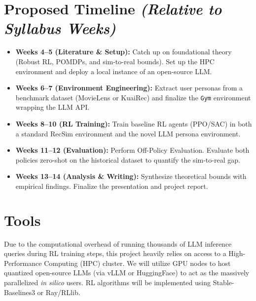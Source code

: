 \documentclass[]{../0_aga-homework}
\begin{document}
\section*{Proposed Timeline \textit{(Relative to Syllabus Weeks)}}
\begin{itemize}
    \item \textbf{Weeks 4--5 (Literature \& Setup):} Catch up on foundational theory (Robust RL, POMDPs, and sim-to-real bounds). Set up the HPC environment and deploy a local instance of an open-source LLM.
    \item \textbf{Weeks 6--7 (Environment Engineering):} Extract user personas from a benchmark dataset (MovieLens or KuaiRec) and finalize the \texttt{Gym} environment wrapping the LLM API.
    \item \textbf{Weeks 8--10 (RL Training):} Train baseline RL agents (PPO/SAC) in both a standard RecSim environment and the novel LLM persona environment.
    \item \textbf{Weeks 11--12 (Evaluation):} Perform Off-Policy Evaluation. Evaluate both policies zero-shot on the historical dataset to quantify the sim-to-real gap.
    \item \textbf{Weeks 13--14 (Analysis \& Writing):} Synthesize theoretical bounds with empirical findings. Finalize the presentation and project report.
\end{itemize}

\section*{Tools}
Due to the computational overhead of running thousands of LLM inference queries during RL training steps, this project heavily relies on access to a High-Performance Computing (HPC) cluster. We will utilize GPU nodes to host quantized open-source LLMs (via vLLM or HuggingFace) to act as the massively parallelized \textit{in silico} users. RL algorithms will be implemented using Stable-Baselines3 or Ray/RLlib.

\newpage
\end{document}
